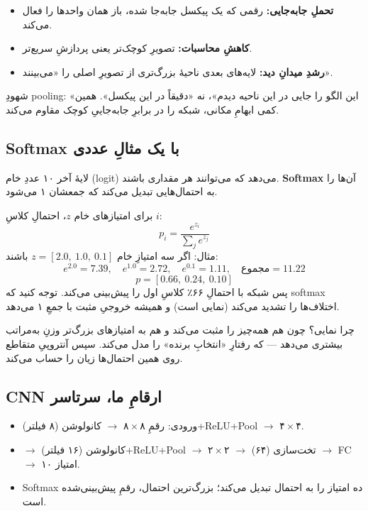 \documentclass[12pt,a4paper]{article}
\begin{document}
\begin{itemize}
  \item \textbf{تحملِ جابه‌جایی:} رقمی که یک پیکسل جابه‌جا شده، باز همان واحدها را فعال می‌کند.
  \item \textbf{کاهشِ محاسبات:} تصویرِ کوچک‌تر یعنی پردازشِ سریع‌تر.
  \item \textbf{رشدِ میدانِ دید:} لایه‌های بعدی ناحیهٔ بزرگ‌تری از تصویرِ اصلی را «می‌بینند».
\end{itemize}

\begin{yaddasht}
شهودِ pooling: «این الگو را جایی در این ناحیه دیدم»، نه «دقیقاً در این پیکسل». همین کمی ابهامِ مکانی، شبکه را در برابرِ جابه‌جاییِ کوچک مقاوم می‌کند.
\end{yaddasht}

\subsection{Softmax با یک مثالِ عددی}

لایهٔ آخر ۱۰ عددِ خام (logit) می‌دهد که می‌توانند هر مقداری باشند. \textbf{Softmax} آن‌ها را به احتمال‌هایی تبدیل می‌کند که جمعشان ۱ می‌شود.

\begin{riyazi}
برای امتیازهای خام $z$، احتمالِ کلاسِ $i$:
\[
p_i = \frac{e^{z_i}}{\sum_j e^{z_j}}
\]
مثال: اگر سه امتیازِ خام $z=[2.0,\ 1.0,\ 0.1]$ باشند:
\[
e^{2.0}=7.39,\quad e^{1.0}=2.72,\quad e^{0.1}=1.11,\quad \text{مجموع}=11.22
\]
\[
p = [0.66,\ 0.24,\ 0.10]
\]
پس شبکه با احتمالِ ۶۶٪ کلاسِ اول را پیش‌بینی می‌کند. توجه کنید که softmax اختلاف‌ها را تشدید می‌کند (نمایی است) و همیشه خروجیِ مثبت با جمعِ ۱ می‌دهد.
\end{riyazi}

\begin{nokte}
چرا نمایی؟ چون هم همه‌چیز را مثبت می‌کند و هم به امتیازهای بزرگ‌تر وزنِ به‌مراتب بیشتری می‌دهد — که رفتارِ «انتخابِ برنده» را مدل می‌کند. سپس آنتروپیِ متقاطع روی همین احتمال‌ها زیان را حساب می‌کند.
\end{nokte}

\subsection{CNNِ ارقامِ ما، سرتاسر}

\begin{itemize}
  \item ورودی: رقمِ $۸\times۸$ $\rightarrow$ کانولوشن (۸ فیلتر)+ReLU+Pool $\rightarrow$ $۴\times۴$.
  \item $\rightarrow$ کانولوشن (۱۶ فیلتر)+ReLU+Pool $\rightarrow$ $۲\times۲$ $\rightarrow$ تخت‌سازی (۶۴) $\rightarrow$ FC $\rightarrow$ ۱۰ امتیاز.
  \item Softmax ده امتیاز را به احتمال تبدیل می‌کند؛ بزرگ‌ترین احتمال، رقمِ پیش‌بینی‌شده است.
\end{itemize}
\end{document}
